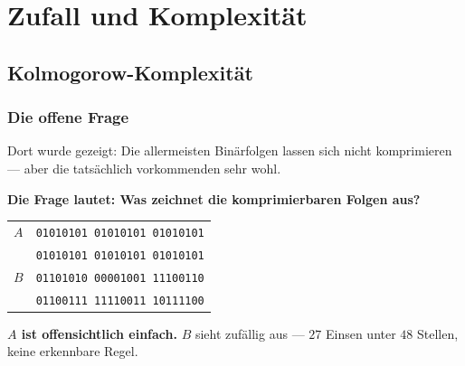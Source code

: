 \part{Zufall und Komplexität}

\chapter{Kolmogorow-Komplexität}

\section{Die offene Frage}

\begin{merksatz}
Dort wurde gezeigt: Die allermeisten Binärfolgen lassen sich nicht komprimieren --- aber die tatsächlich vorkommenden sehr wohl.

\begin{center}
\begin{minipage}{0.9\textwidth}
\textbf{Die Frage lautet: Was zeichnet die komprimierbaren Folgen aus?}
\end{minipage}
\end{center}

\begin{center}
{\small
\renewcommand{\arraystretch}{1.55}
\begin{tabular}{@{}P{0.8cm}P{7.6cm}@{}}
\toprule
$A$ & \texttt{01010101 01010101 01010101}\\
 & \texttt{01010101 01010101 01010101}\\
\midrule
$B$ & \texttt{01101010 00001001 11100110}\\
 & \texttt{01100111 11110011 10111100}\\
\bottomrule
\end{tabular}}
\end{center}

\begin{center}
\begin{minipage}{0.9\textwidth}
\textbf{$A$ ist offensichtlich einfach.} $B$ sieht zufällig aus --- $27$ Einsen unter $48$ Stellen, keine erkennbare Regel.
\end{minipage}
\end{center}

\begin{center}
\begin{minipage}{0.88\textwidth}
\end{minipage}
\end{center}


\end{merksatz}
